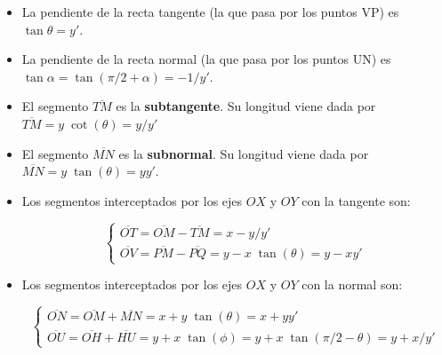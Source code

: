 	\begin{itemize}
		\item La pendiente de la recta tangente (la que pasa por los puntos VP) es $\tan \theta = y'$.
		\item La pendiente de la recta normal (la que pasa por los puntos UN) es $\tan \alpha = \tan (\pi/2 + \alpha)=-1/y'$.
		\item El segmento $\overline {TM}$ es la \textbf{subtangente}. Su longitud viene dada por $\overline  {TM}=y \; \cot( \theta ) = y/y'$ 
		\item El segmento $\overline{MN}$ es la \textbf{subnormal}. Su longitud viene dada por $\overline{MN}=y\; \tan(\theta)=yy'$.	
		\item Los segmentos interceptados por los ejes $OX$ y $OY$ con la tangente son:
		
		
		\begin{equation*}
		\begin{cases}
		\overline{OT}=\overline{OM}-\overline{TM}=x-y/y'  \\ 
		\overline{OV}=\overline{PM}-\overline{PQ}=y-x\; \tan(\theta)=y-xy'   
		\end{cases}
		\end{equation*}
		
		
		\item Los segmentos interceptados por los ejes $OX$ y $OY$ con la normal son:
		
		\begin{equation*}
		\begin{cases}
			\overline{ON}=\overline{OM}+\overline{MN}=x+y\; \tan (\theta)=x+yy'  \\ 
			\overline{OU}
			=\overline{OH}+\overline{HU}=y+x\; \tan (\phi)=y+x\; \tan (\pi/2 - \theta)=y+x/y' 
		\end{cases}
		\end{equation*}
		
		
		
		\end{itemize}
	
